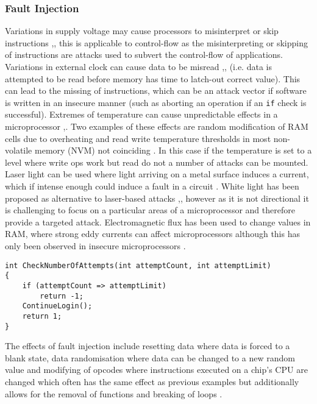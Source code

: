 \subsubsection*{Fault Injection}

Variations in supply voltage may cause processors to misinterpret or skip instructions \cite{Anderson1996},\cite{Blomer2010}, this is applicable to control-flow as the misinterpreting or skipping of instructions are attacks used to subvert the control-flow of applications.
Variations in external clock can cause data to be misread \cite{Anderson1996},\cite{Street},\cite{Kommerling1999} (i.e. data is attempted to be read before memory has time to latch-out correct value). This can lead to the missing of instructions, which can be an attack vector if software is written in an insecure manner (such as aborting an operation if an \verb|if| check is successful).
Extremes of temperature can cause unpredictable effects in a microprocessor \cite{Boneh},\cite{Govindavajhala2003}. Two examples of these effects are random modification of RAM cells due to overheating and read write temperature thresholds in most non-volatile memory (NVM) not coinciding \cite{Bar-el2006}. In this case if the temperature is set to a level where write ops work but read do not a number of attacks can be mounted. Laser light can be used where light arriving on a metal surface induces a current, which if intense enough could induce a fault in a circuit \cite{Habing1965}. White light has been proposed as alternative to laser-based attacks \cite{Anderson1996},\cite{Skorobogatov2007}, however as it is not directional it is challenging to focus on a particular areas of a microprocessor and therefore provide a targeted attack. Electromagnetic flux has been used to change values in RAM, where strong eddy currents can affect microprocessors although this has only been observed in insecure microprocessors \cite{Samyde2003}.

\begin{lstlisting}[language={[Sharp]C},caption={An example of code which is vulnerable to skipping of instructions},label={lst:instructionSkip}]
int CheckNumberOfAttempts(int attemptCount, int attemptLimit)
{
    if (attemptCount => attemptLimit)
        return -1;
    ContinueLogin();
    return 1;
}
\end{lstlisting}

The effects of fault injection include resetting data where data is forced to a blank state, data randomisation where data can be changed to a new random value and modifying of opcodes where instructions executed on a chip's CPU are changed which often has the same effect as previous examples but additionally allows for the removal of functions and breaking of loops \cite{Anderson1996}.
  
